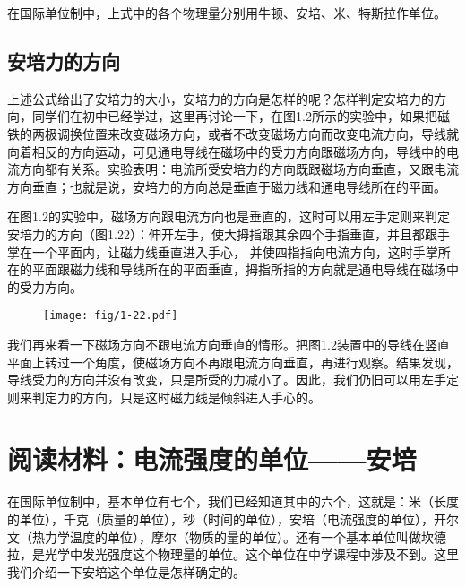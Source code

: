 在国际单位制中，上式中的各个物理量分别用牛顿、安培、米、特斯拉作单位。

\subsection{安培力的方向}


上述公式给出了安培力的大小，安培力的方向是怎样的呢？怎样判定安培力的方向，同学们在初中已经学过，这里再讨论一下，在图1.2所示的实验中，如果把磁铁的两极调换位置来改变磁场方向，或者不改变磁场方向而改变电流方向，导线就向着相反的方向运动，可见通电导线在磁场中的受力方向跟磁场方向，导线中的电流方向都有关系。实验表明：电流所受安培力的方向既跟磁场方向垂直，又跟电流方向垂直；也就是说，安培力的方向总是垂直于磁力线和通电导线所在的平面。

在图1.2的实验中，磁场方向跟电流方向也是垂直的，这时可以用左手定则来判定安培力的方向（图1.22）：伸开左手，使大拇指跟其余四个手指垂直，并且都跟手掌在一个平面内，让磁力线垂直进入手心，
并使四指指向电流方向，这时手掌所在的平面跟磁力线和导线所在的平面垂直，拇指所指的方向就是通电导线在磁场中的受力方向。
\begin{figure}[htp]\centering
\texttt{[image: fig/1-22.pdf]}
\caption{}
\end{figure}

我们再来看一下磁场方向不跟电流方向垂直的情形。把图1.2装置中的导线在竖直平面上转过一个角度，使磁场方向不再跟电流方向垂直，再进行观察。结果发现，导线受力的方向并没有改变，只是所受的力减小了。因此，我们仍旧可以用左手定则来判定力的方向，只是这时磁力线是倾斜进入手心的。

\section*{阅读材料：电流强度的单位——安培}
在国际单位制中，基本单位有七个，我们已经知道其中的六个，这就是：米（长度的单位），千克（质量的单位），秒（时间的单位），安培（电流强度的单位），开尔文（热力学温度的单位），摩尔（物质的量的单位）。还有一个基本单位叫做坎德拉，是光学中发光强度这个物理量的单位。这个单位在中学课程中涉及不到。这里我们介绍一下安培这个单位是怎样确定的。

